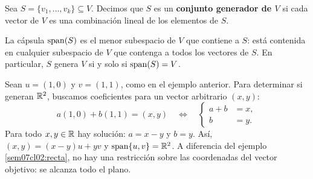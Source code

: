 \documentclass[compacto,10pt]{pubciencias-notas}
\begin{document}
\begin{defi}\label{sem07cl02:generado}
    Sea $S=\{v_1,\ldots,v_k\}\subseteq V$.
    Decimos que $S$ es un \textbf{conjunto generador de $V$} si cada vector
    de $V$ es una combinación lineal de los elementos de $S$.
\end{defi}

\begin{teo}
    La cápsula $\operatorname{span}(S)$ es el menor subespacio de $V$ que contiene a $S$:
    está contenida en cualquier subespacio de $V$ que contenga a todos
    los vectores de $S$. En particular, $S$ genera $V$ si y solo si
    $\operatorname{span}(S)=V$.
\end{teo}
\begin{ejem}\label{sem07cl02:generarR2}
    Sean $u=(1,0)$ y $v=(1,1)$, como en el ejemplo anterior. Para determinar
    si generan $\mathbb{R}^2$, buscamos coeficientes para un vector arbitrario
    $(x,y)$:
    \[
        a(1,0)+b(1,1)=(x,y)
        \quad\Longleftrightarrow\quad
        \left\{\begin{aligned}a+b&=x,\\b&=y.\end{aligned}\right.
    \]
    Para todo $x,y\in\mathbb{R}$ hay solución: $a=x-y$ y $b=y$. Así,
    $(x,y)=(x-y)u+yv$ y
    $\operatorname{span}\{u,v\}=\mathbb{R}^2$.
    A diferencia del ejemplo \ref{sem07cl02:recta}, no hay una restricción
    sobre las coordenadas del vector objetivo: se alcanza todo el plano.
\end{ejem}
\end{document}
